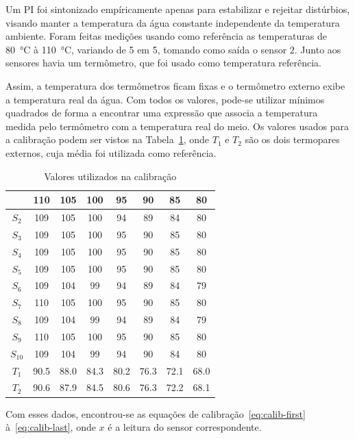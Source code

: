 Um PI foi sintonizado empíricamente apenas para estabilizar e rejeitar
distúrbios, visando manter a temperatura da água constante independente da
temperatura ambiente. Foram feitas medições usando como referência as
temperaturas de \SI{80}{\degreeCelsius} à \SI{110}{\degreeCelsius}, variando de
5 em 5, tomando como saída o sensor \(2\). Junto aos sensores havia um
termômetro, que foi usado como temperatura referência.

Assim, a temperatura dos termômetros ficam fixas e o termômetro externo exibe a
temperatura real da água. Com todos os valores, pode-se utilizar mínimos
quadrados de forma a encontrar uma expressão que associa a temperatura medida
pelo termômetro com a temperatura real do meio. Os valores usados para a
calibração podem ser vistos na Tabela~\ref{tbl:calib-coefs}, onde \(T_1\) e
\(T_2\) são os dois termopares externos, cuja média foi utilizada como
referência.

\begin{table}[ht!]
	\centering
	\caption{Valores utilizados na calibração}%
	\label{tbl:calib-coefs}
	\begin{tabular}{c|ccccccc}
		           & 110  & 105  & 100  & 95   & 90   & 85   & 80   \\ \midrule
		\(S_2\)    & 109  & 105  & 100  & 94   & 89   & 84   & 80   \\
		\(S_3\)    & 109  & 105  & 100  & 95   & 90   & 85   & 80   \\
		\(S_4\)    & 109  & 105  & 100  & 95   & 90   & 85   & 80   \\
		\(S_5\)    & 109  & 105  & 100  & 95   & 90   & 85   & 80   \\
		\(S_6\)    & 109  & 104  & 99   & 94   & 89   & 84   & 79   \\
		\(S_7\)    & 110  & 105  & 100  & 95   & 90   & 85   & 80   \\
		\(S_8\)    & 109  & 104  & 99   & 94   & 89   & 84   & 79   \\
		\(S_9\)    & 110  & 105  & 100  & 95   & 90   & 85   & 80   \\
		\(S_{10}\) & 109  & 104  & 99   & 94   & 90   & 84   & 80   \\
		\(T_1\)    & 90.5 & 88.0 & 84.3 & 80.2 & 76.3 & 72.1 & 68.0 \\
		\(T_2\)    & 90.6 & 87.9 & 84.5 & 80.6 & 76.3 & 72.2 & 68.1
	\end{tabular}
\end{table}

Com esses dados, encontrou-se as equações de calibração~\eqref{eq:calib-first}
à~\eqref{eq:calib-last}, onde \(x\) é a leitura do sensor correspondente.

